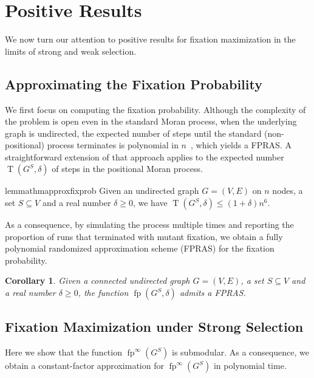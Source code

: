 \documentclass[letterpaper]{article}
\def\mypath{}
\newtheorem{corollary}{Corollary}
\newcommand{\X}{\mathsf{X}}
\newcommand{\fp}{\operatorname{fp}}
\newcommand{\ft}{\operatorname{T}}
\newcommand{\FitAdv}{\delta}
\begin{document}
%
\section{Positive Results}\label{sec:positive}
We now turn our attention to positive results for fixation maximization in the limits of strong and weak selection.


\subsection{Approximating the Fixation Probability}\label{subsec:approx}

We first focus on computing the fixation probability.
Although the complexity of the problem is open even in the standard Moran process,
when the underlying graph is undirected, the expected number of steps until
the standard (non-positional) process terminates %
is polynomial in $n$~\cite{Diaz2014}, which yields a FPRAS.
A straightforward extension of that approach applies to the expected number $\ft(G^S,\FitAdv)$ of steps in the positional Moran process.
\begin{restatable}{lemma}{thmapproxfixprob}\label{thm:approx_fix_prob}
Given an undirected graph $G=(V,E)$ on $n$ nodes,
a set $S\subseteq V$ and a real number $\FitAdv\geq 0$,
we have $\ft(G^S,\FitAdv)\le (1+\FitAdv)n^6$.
\end{restatable}

As a consequence, by simulating the process multiple times and reporting the proportion of runs that terminated with mutant fixation, we obtain a fully polynomial randomized approximation scheme (FPRAS) for the fixation probability.

\begin{corollary}\label{cor:approx_fix_prob}
Given a connected undirected graph $G=(V,E)$, a set $S\subseteq V$ and a real number $\FitAdv\geq 0$,
the function $\fp(G^S,\FitAdv)$ admits a FPRAS.
\end{corollary}


\subsection{Fixation Maximization under Strong Selection}\label{subsec:positive_strong}

Here we show that the function $\fp^\infty(G^S)$ is submodular.
As a consequence, we obtain a constant-factor approximation for $\fp^\infty(G^S)$ in polynomial time.
\end{document}
